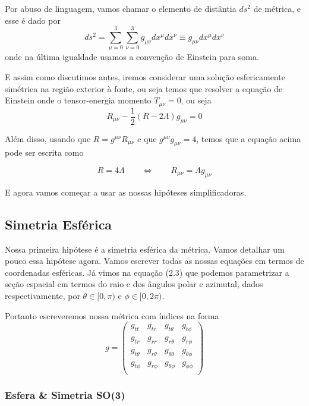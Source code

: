 \documentclass[11pt]{article}
\begin{document}
Por abuso de linguagem, vamos chamar o elemento de distântia \(ds^2\) de
métrica, e esse é dado por
\[ \tag{3.2} ds^2 = \sum_{\mu=0}^3 \sum_{\nu=0}^3 g_{\mu\nu} dx^\mu dx^\nu  \equiv  g_{\mu\nu} dx^\mu dx^\nu \]
onde na última igualdade usamos a convenção de Einstein para soma.

E assim como discutimos antes, iremos considerar uma solução
esfericamente simétrica na região exterior à fonte, ou seja temos que
resolver a equação de Einstein onde o tensor-energia momento
\(T_{\mu\nu} = 0\), ou seja
\[ \tag{3.3.a} R_{\mu\nu} - \frac{1}{2} (R - 2 \Lambda) g_{\mu\nu} = 0 \]

Além disso, usando que \(R = g^{\mu\nu} R_{\mu\nu}\) e que
\(g^{\mu\nu} g_{\mu\nu} = 4\), temos que a equação acima pode ser
escrita como

\[ \tag{3.3.b} R = 4\Lambda
\qquad \Leftrightarrow \qquad R_{\mu\nu} = \Lambda g_{\mu\nu}\]

E agora vamos começar a usar as nossas hipóteses simplificadoras.

    \hypertarget{simetria-esfuxe9rica}{%
\subsection{Simetria Esférica}\label{simetria-esfuxe9rica}}

    Nossa primeira hipótese é a simetria esférica da métrica. Vamos detalhar
um pouco essa hipótese agora. Vamos escrever todas as nossas equações em
termos de coordenadas esféricas. Já vimos na equação (2.3) que podemos
parametrizar a seção espacial em termos do raio e dos ângulos polar e
azimutal, dados respectivamente, por \(\theta \in [0, \pi)\) e
\(\phi \in [0, 2\pi)\).

Portanto escreveremos nossa métrica com índices na forma
\[ \tag{3.4} g = 
\begin{pmatrix}
g_{tt} & g_{tr}& g_{t\theta} & g_{t\phi} \\
g_{tr} & g_{rr} & g_{r\theta} & g_{r \phi} \\
g_{t\theta} & g_{r \theta} & g_{\theta \theta} & g_{\theta \phi} \\
g_{t\phi} & g_{r \phi} & g_{\theta\phi} & g_{\phi\phi} \\
\end{pmatrix} \]

    \hypertarget{esfera-simetria-so3}{%
\subsubsection{Esfera \& Simetria SO(3)}\label{esfera-simetria-so3}}
\end{document}

